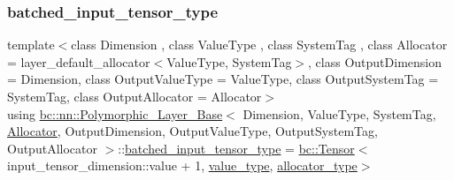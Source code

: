 \subsubsection{\texorpdfstring{batched\+\_\+input\+\_\+tensor\+\_\+type}{batched\_input\_tensor\_type}\hspace{0.1cm}{\footnotesize\ttfamily [1/2]}}
{\footnotesize\ttfamily template$<$class Dimension , class Value\+Type , class System\+Tag , class Allocator  = layer\+\_\+default\+\_\+allocator$<$\+Value\+Type, System\+Tag$>$, class Output\+Dimension  = Dimension, class Output\+Value\+Type  = Value\+Type, class Output\+System\+Tag  = System\+Tag, class Output\+Allocator  = Allocator$>$ \\
using \hyperlink{structbc_1_1nn_1_1Polymorphic__Layer__Base}{bc\+::nn\+::\+Polymorphic\+\_\+\+Layer\+\_\+\+Base}$<$ Dimension, Value\+Type, System\+Tag, \hyperlink{classbc_1_1allocators_1_1Allocator}{Allocator}, Output\+Dimension, Output\+Value\+Type, Output\+System\+Tag, Output\+Allocator $>$\+::\hyperlink{structbc_1_1nn_1_1Polymorphic__Layer__Base_ae694b03dd73923ff973b0d2c9156e161}{batched\+\_\+input\+\_\+tensor\+\_\+type} =  \hyperlink{namespacebc_a659391e47ab612be3ba6c18cf9c89159}{bc\+::\+Tensor}$<$input\+\_\+tensor\+\_\+dimension\+::value + 1, \hyperlink{structbc_1_1nn_1_1Polymorphic__Layer__Base_aa7d46845ee0a4544003a6f8fe3b7f52a}{value\+\_\+type}, \hyperlink{structbc_1_1nn_1_1Polymorphic__Layer__Base_a1414f8c37dea6254aebf63e4486ed818}{allocator\+\_\+type}$>$}

\mbox{\label{structbc_1_1nn_1_1Polymorphic__Layer__Base_ae694b03dd73923ff973b0d2c9156e161}} 
